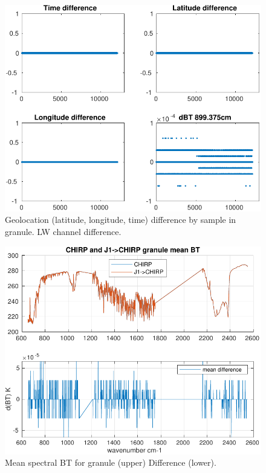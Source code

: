 \documentclass[11pt]{article}
\begin{document}
\begin{figure}[htbp]
\centering
\includegraphics[width=.9\linewidth]{./figs/2020d001g120_chirp_j1_geo_diff.pdf}
\caption{\label{fig:orgfa70246}
Geolocation (latitude, longitude, time) difference by sample in granule. LW channel difference.}
\end{figure}

\begin{figure}[htbp]
\centering
\includegraphics[width=.9\linewidth]{./figs/2020d001g120_chirp_j1_bt_spectrum_mean.pdf}
\caption{\label{fig:org7a964df}
Mean spectral BT for granule (upper) Difference (lower).}
\end{figure}
\end{document}
